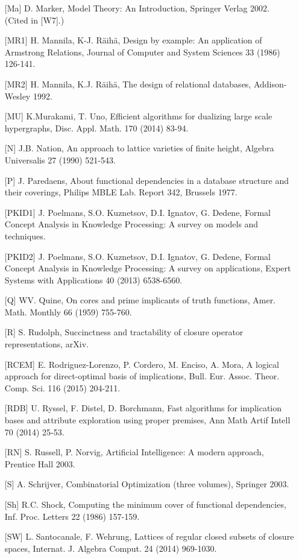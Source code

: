 \documentclass[11pt]{article}
\begin{document}
\begin{enumerate}
\item[{[Ma]}] D. Marker, Model Theory: An Introduction, Springer Verlag 2002. (Cited in [W7].)
\item[{[MR1]}] H. Mannila, K-J. R\"{a}ih\"{a}, Design by example: An application of Armstrong Relations, Journal of Computer and System Sciences 33 (1986) 126-141.	
		\item[{[MR2]}] H. Mannila, K.J. R\"{a}ih\"{a}, The design of relational databases, Addison-Wesley 1992.
\item[{[MU]}] K.Murakami, T. Uno, Efficient algorithms for dualizing large scale hypergraphs, Disc. Appl. Math. 170 (2014) 83-94.
\item[{[N]}] J.B. Nation, An approach to lattice varieties of finite height, Algebra Universalis 27 (1990) 521-543.
\item[{[P]}] J. Paredaens, About functional dependencies in a database structure and their coverings, Philips MBLE Lab. Report 342, Brussels 1977.
\item[{[PKID1]}] J. Poelmans, S.O. Kuznetsov, D.I. Ignatov, G. Dedene, Formal Concept Analysis in Knowledge Processing: A survey on models and techniques.
\item[{[PKID2]}] J. Poelmans, S.O. Kuznetsov, D.I. Ignatov, G. Dedene, Formal Concept Analysis in Knowledge Processing: A survey on applications, Expert Systems with Applications 40 (2013) 6538-6560.
\item[{[Q]}] WV. Quine, On cores and prime implicants of truth functions, Amer. Math. Monthly 66 (1959) 755-760.
\item[{[R]}] S. Rudolph, Succinctness and tractability of closure operator representations, arXiv.
\item[{[RCEM]}] E. Rodriguez-Lorenzo, P. Cordero, M. Enciso, A. Mora, A logical approach for direct-optimal basis of implications, Bull. Eur. Assoc. Theor. Comp. Sci. 116 (2015) 204-211.
\item[{[RDB]}] U. Ryssel, F. Distel, D. Borchmann, Fast algorithms for implication bases and attribute exploration using proper premises, Ann Math Artif Intell 70 (2014) 25-53.
\item[{[RN]}] S. Russell, P. Norvig, Artificial Intelligence: A modern approach, Prentice Hall 2003.
	\item[{[S]}] A. Schrijver, Combinatorial Optimization (three volumes), Springer 2003.
	\item[{[Sh]}] R.C. Shock, Computing the minimum cover of functional dependencies, Inf. Proc. Letters 22 (1986) 157-159.
	\item[{[SW]}] L. Santocanale, F. Wehrung, Lattices of regular closed subsets of closure spaces, Internat. J. Algebra Comput. 24 (2014) 969-1030.

\end{enumerate}
\end{document}
